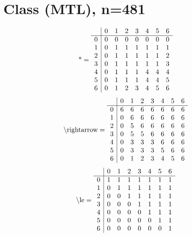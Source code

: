 \documentclass[11pt]{article}
\begin{document}
\section{Class (MTL), n=481}
\[\text{*} = 
\begin{array}{r | r r r r r r r}
 & 0 & 1 & 2 & 3 & 4 & 5 & 6 \\ \hline
0 & 0 & 0 & 0 & 0 & 0 & 0 & 0 \\
1 & 0 & 1 & 1 & 1 & 1 & 1 & 1 \\
2 & 0 & 1 & 1 & 1 & 1 & 1 & 2 \\
3 & 0 & 1 & 1 & 1 & 1 & 1 & 3 \\
4 & 0 & 1 & 1 & 1 & 4 & 4 & 4 \\
5 & 0 & 1 & 1 & 1 & 4 & 4 & 5 \\
6 & 0 & 1 & 2 & 3 & 4 & 5 & 6 \\
\end{array}
\]
\[\text{\textbackslash rightarrow} = 
\begin{array}{r | r r r r r r r}
 & 0 & 1 & 2 & 3 & 4 & 5 & 6 \\ \hline
0 & 6 & 6 & 6 & 6 & 6 & 6 & 6 \\
1 & 0 & 6 & 6 & 6 & 6 & 6 & 6 \\
2 & 0 & 5 & 6 & 6 & 6 & 6 & 6 \\
3 & 0 & 5 & 5 & 6 & 6 & 6 & 6 \\
4 & 0 & 3 & 3 & 3 & 6 & 6 & 6 \\
5 & 0 & 3 & 3 & 3 & 5 & 6 & 6 \\
6 & 0 & 1 & 2 & 3 & 4 & 5 & 6 \\
\end{array}
\]
\[\text{\textbackslash le} = 
\begin{array}{r | r r r r r r r}
 & 0 & 1 & 2 & 3 & 4 & 5 & 6 \\ \hline
0 & 1 & 1 & 1 & 1 & 1 & 1 & 1 \\
1 & 0 & 1 & 1 & 1 & 1 & 1 & 1 \\
2 & 0 & 0 & 1 & 1 & 1 & 1 & 1 \\
3 & 0 & 0 & 0 & 1 & 1 & 1 & 1 \\
4 & 0 & 0 & 0 & 0 & 1 & 1 & 1 \\
5 & 0 & 0 & 0 & 0 & 0 & 1 & 1 \\
6 & 0 & 0 & 0 & 0 & 0 & 0 & 1 \\
\end{array}
\]
\end{document}
